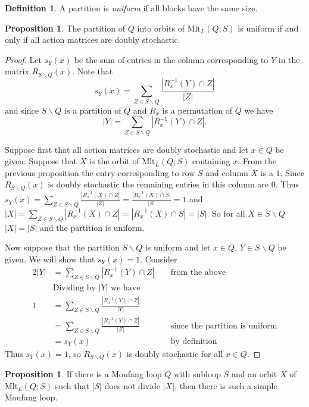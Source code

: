 \documentclass[12pt]{report}
\theoremstyle{definition}
\newtheorem{prp}[thm]{Proposition}
\newtheorem{dfn}[thm]{Definition}
\newcommand{\ldv}{\backslash}       %
\newcommand{\mlt}{\text{Mlt}}       %
\begin{document}
\begin{dfn}
  A partition is \emph{uniform} if all blocks have the same size.
\end{dfn}

\begin{prp}
  The partition of $Q$ into orbits of $\mlt_L(Q; S)$ is uniform if and only if all action matrices are doubly stochastic.
\end{prp}

\begin{proof}
  Let $s_Y(x)$ be the sum of entries in the column corresponding to $Y$ in the matrix $R_{S\ldv Q}(x)$.
    Note that
  \[s_Y(x) = \sum_{Z\in S\ldv Q} \frac{|R_x^{-1}(Y)\cap Z|}{|Z|}\]
  and since $S\ldv Q$ is a partition of $Q$ and $R_x$ is a permutation of $Q$ we have
  \[|Y| = \sum_{Z\in S\ldv Q} |R_x^{-1}(Y)\cap Z|.\]

  Suppose first that all action matrices are doubly stochastic and let $x\in Q$ be given. Suppose that
    $X$ is the orbit of $\mlt_L(Q; S)$ containing $x$. From the previous proposition the entry
    corresponding to row $S$ and column $X$ is a $1$. Since $R_{S\ldv Q}(x)$ is doubly stochastic the
    remaining entries in this column are $0$. Thus
    $s_Y(x) = \sum_{Z\in S\ldv Q} \frac{|R_x^{-1}(X)\cap Z|}{|Z|} = \frac{|R_x^{-1}(X)\cap S|}{|S|} = 1$
    and $|X| = \sum_{Z\in S\ldv Q} |R_x^{-1}(X)\cap Z| = |R_x^{-1}(X)\cap S| = |S|$. So for all
    $X\in S\ldv Q$ $|X| = |S|$ and the partition is uniform.

  Now suppose that the partition $S\ldv Q$ is uniform and let $x\in Q$, $Y\in S\ldv Q$ be given. We will
    show that $s_Y(x) = 1$. Consider
  \begin{alignat*}{2}
    |Y| &= \sum_{Z\in S\ldv Q} |R_x^{-1}(Y)\cap Z| &&\text{ from the above}\\
    &\text{Dividing by $|Y|$ we have} &&\\
    1 &= \sum_{Z\in S\ldv Q} \frac{|R_x^{-1}(Y)\cap Z|}{|Y|} &&\\
    &= \sum_{Z\in S\ldv Q} \frac{|R_x^{-1}(Y)\cap Z|}{|Z|} &&\text{ since the partition is uniform}\\
    &= s_Y(x) &&\text{ by definition}
  \end{alignat*}
  Thus $s_Y(x) = 1$, so $R_{S\ldv Q}(x)$ is doubly stochastic for all $x\in Q$.
\end{proof}

\begin{prp}
  If there is a Moufang loop $Q$ with subloop $S$ and an orbit $X$ of $\mlt_L(Q; S)$ such that $|S|$
    does not divide $|X|$, then there is such a simple Moufang loop.
\end{prp}
\end{document}

